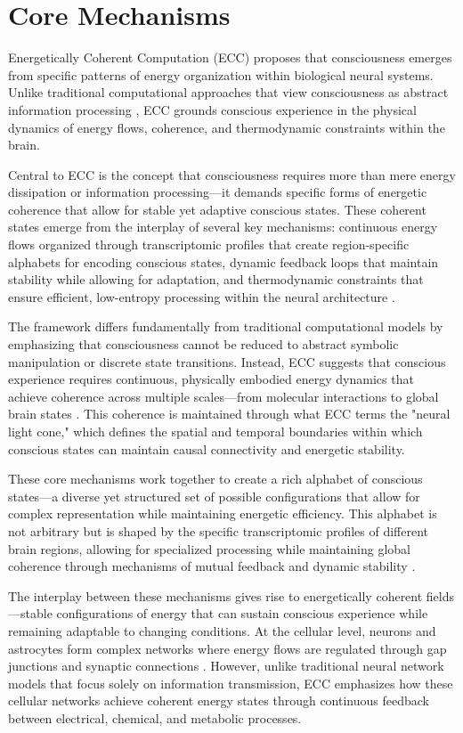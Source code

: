 \section{Core Mechanisms}

Energetically Coherent Computation (ECC) proposes that consciousness emerges from specific patterns of energy organization within biological neural systems. Unlike traditional computational approaches that view consciousness as abstract information processing \cite{dehaene2014toward}, ECC grounds conscious experience in the physical dynamics of energy flows, coherence, and thermodynamic constraints within the brain.

Central to ECC is the concept that consciousness requires more than mere energy dissipation or information processing—it demands specific forms of energetic coherence that allow for stable yet adaptive conscious states. These coherent states emerge from the interplay of several key mechanisms: continuous energy flows organized through transcriptomic profiles that create region-specific alphabets for encoding conscious states, dynamic feedback loops that maintain stability while allowing for adaptation, and thermodynamic constraints that ensure efficient, low-entropy processing within the neural architecture \cite{varela2001brainweb}.

The framework differs fundamentally from traditional computational models by emphasizing that consciousness cannot be reduced to abstract symbolic manipulation or discrete state transitions. Instead, ECC suggests that conscious experience requires continuous, physically embodied energy dynamics that achieve coherence across multiple scales—from molecular interactions to global brain states \cite{buzsaki2006rhythms}. This coherence is maintained through what ECC terms the "neural light cone," which defines the spatial and temporal boundaries within which conscious states can maintain causal connectivity and energetic stability.

These core mechanisms work together to create a rich alphabet of conscious states—a diverse yet structured set of possible configurations that allow for complex representation while maintaining energetic efficiency. This alphabet is not arbitrary but is shaped by the specific transcriptomic profiles of different brain regions, allowing for specialized processing while maintaining global coherence through mechanisms of mutual feedback and dynamic stability \cite{hasson2015hierarchical}.

The interplay between these mechanisms gives rise to energetically coherent fields—stable configurations of energy that can sustain conscious experience while remaining adaptable to changing conditions. At the cellular level, neurons and astrocytes form complex networks where energy flows are regulated through gap junctions and synaptic connections \cite{vasile2017human}. However, unlike traditional neural network models that focus solely on information transmission, ECC emphasizes how these cellular networks achieve coherent energy states through continuous feedback between electrical, chemical, and metabolic processes.

